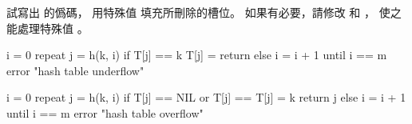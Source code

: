 \startEXERCISE
試寫出  的僞碼，
用特殊值  填充所刪除的槽位。
如果有必要，請修改  和 ，
使之能處理特殊值 。
\stopEXERCISE

\startANSWER
{}
\startCLRSCODE
i = 0
repeat
	j = h(k, i)
	if T[j] == k
		T[j] = 
		return
	else
		i = i + 1
until i == m
error "hash table underflow"
\stopCLRSCODE

\startCLRSCODE
i = 0
repeat
	j = h(k, i)
	if T[j] == NIL or T[j] == 
		T[j] = k
		return j
	else
		i = i + 1
until i == m
error "hash table overflow"
\stopCLRSCODE
\stopANSWER
